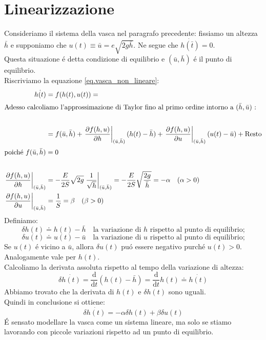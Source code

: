 \documentclass[../main.tex]{subfiles}
\begin{document}
	\section{Linearizzazione}
	Consideriamo il sistema della vasca nel paragrafo precedente: fissiamo un altezza $ \bar{h} $ e supponiamo che $u(t) \equiv \bar{u} = e \sqrt{2g \bar{h}}$. Ne segue che $ \dot{h(\bar{t})} =0 $.\\
	Questa situazione \'e detta condizione di equilibrio e $( \bar{u} , \bar{h}) $ \'e il punto di equilibrio.\\
	Riscriviamo la equazione \ref{eq.vasca_non_lineare}:
	\begin{align*}	
			\dot{h(t)} &= f(h(t),u(t)) =\\		
			\intertext{Adesso calcoliamo l'approssimazione di Taylor fino al primo ordine intorno a $ (\bar{h},\bar{u}) $ :} \\
			&= f(\bar{u},\bar{h}) + \left. \frac{\partial f(h,u)}{\partial h} \right|_{(\bar{u},\bar{h})} (h(t) - \bar{h}) + \left. \frac{\partial f(h,u)}{\partial u} \right|_{(\bar{u},\bar{h})} (u(t) - \bar{u}) + \mbox{Resto}\\
			\intertext{poich\'e $ f(\bar{u},\bar{h}) =0$}\\
			\left. \frac{\partial f(h,u)}{\partial h} \right|_{(\bar{u},\bar{h})} &= - \frac{E}{2S} \sqrt{2g} \left. \frac{1}{\sqrt{h}} \right|_{(\bar{u},\bar{h})} = - \frac{E}{2S} \sqrt{\frac{2g}{\bar{h}}} = - \alpha \quad (\alpha > 0)\\
			\left. \frac{\partial f(h,u)}{\partial u} \right|_{(\bar{u},\bar{h})} &= \frac{1}{S} = \beta \quad (\beta > 0)  
	\end{align*}
	Definiamo:
	\[ \delta h(t) \doteq h(t)- \bar{h} \quad \text{la variazione di $h$ rispetto al punto di equilibrio;} \]
	\[ \delta u(t) \doteq u(t)- \bar{u} \quad \text{la variazione di $u$ rispetto al punto di equilibrio;} \]
	Se $u(t)$ \'e vicino a $\bar{u}$, allora $\delta u(t)$ pu\'o essere negativo purché $u(t)>0$. Analogamente vale per $h(t)$.\\
	Calcoliamo la derivata assoluta rispetto al tempo della variazione di altezza:
	\[ \delta \dot{h(t)} = \frac{\mathrm{d}}{\mathrm{d} t}(h(t)-\bar{h}) = \frac{\mathrm{d}}{\mathrm{d} t}h(t) \doteq \dot{h(t)} \] 
	Abbiamo trovato che la derivata di $h(t)$ e $\delta h(t)$ sono uguali.\\
	Quindi in conclusione si ottiene:
	\begin{equation}
		\delta \dot{h(t)} = -\alpha \delta h(t) + \beta \delta u(t)
	\end{equation}
	\'E sensato modellare la vasca come un sistema lineare, ma solo se stiamo lavorando con piccole variazioni rispetto ad un punto di equilibrio.
\end{document}
